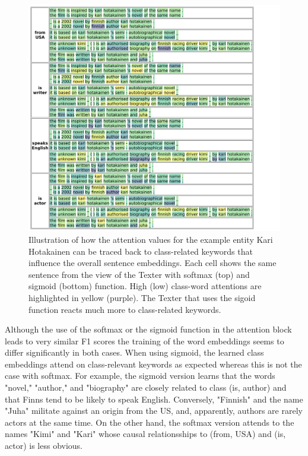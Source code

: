 \begin{figure}
    \centering
    \includegraphics[width=\textwidth]{5_experiments/3_texter/2_static/9_attention/kari_softmax}
    \caption{Illustration of how the attention values for the example entity Kari Hotakainen can be traced back to class-related keywords that influence the overall sentence embeddings. Each cell shows the same sentence from the view of the Texter with softmax (top) and sigmoid (bottom) function. High (low) class-word attentions are highlighted in yellow (purple). The Texter that uses the sigoid function reacts much more to class-related keywords.}
    \label{fig:5_experiments/3_texter/2_static/9_attention/kari_softmax}
\end{figure}

Although the use of the softmax or the sigmoid function in the attention block leads to very similar F1 scores the training of the word embeddings seems to differ significantly in both cases. When using sigmoid, the learned class embeddings attend on class-relevant keywords as expected whereas this is not the case with softmax. For example, the sigmoid version learns that the words "novel," "author," and "biography" are closely related to class (is, author) and that Finns tend to be likely to speak English. Conversely, "Finnish" and the name "Juha" militate against an origin from the US, and, apparently, authors are rarely actors at the same time. On the other hand, the softmax version attends to the names "Kimi" and "Kari" whose causal relationsships to (from, USA) and (is, actor) is less obvious.

